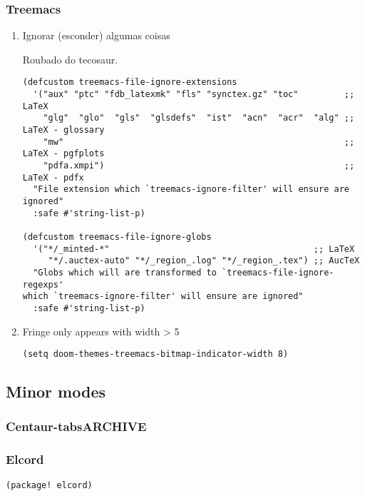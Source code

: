 \documentclass[11pt]{article}
\begin{document}
\subsubsection{Treemacs}
\label{sec:orgcd5b88a}
\begin{enumerate}
\item Ignorar (esconder) algumas coisas
\label{sec:orge446025}

Roubado do tecosaur.

\begin{verbatim}
(defcustom treemacs-file-ignore-extensions
  '("aux" "ptc" "fdb_latexmk" "fls" "synctex.gz" "toc"         ;; LaTeX
    "glg"  "glo"  "gls"  "glsdefs"  "ist"  "acn"  "acr"  "alg" ;; LaTeX - glossary
    "mw"                                                       ;; LaTeX - pgfplots
    "pdfa.xmpi")                                               ;; LaTeX - pdfx
  "File extension which `treemacs-ignore-filter' will ensure are ignored"
  :safe #'string-list-p)

(defcustom treemacs-file-ignore-globs
  '("*/_minted-*"                                        ;; LaTeX
     "*/.auctex-auto" "*/_region_.log" "*/_region_.tex") ;; AucTeX
  "Globs which will are transformed to `treemacs-file-ignore-regexps'
which `treemacs-ignore-filter' will ensure are ignored"
  :safe #'string-list-p)
\end{verbatim}
\item Fringe only appears with width > 5
\label{sec:org4f3ff4b}
\begin{verbatim}
(setq doom-themes-treemacs-bitmap-indicator-width 8)
\end{verbatim}
\end{enumerate}

\subsection{Minor modes}
\label{sec:org276591d}
\subsubsection{Centaur-tabs\hfill{}\textsc{ARCHIVE}}
\label{sec:org12c1489}

\subsubsection{Elcord}
\label{sec:orgdaa57f9}

\begin{verbatim}
(package! elcord)
\end{verbatim}
\end{document}

